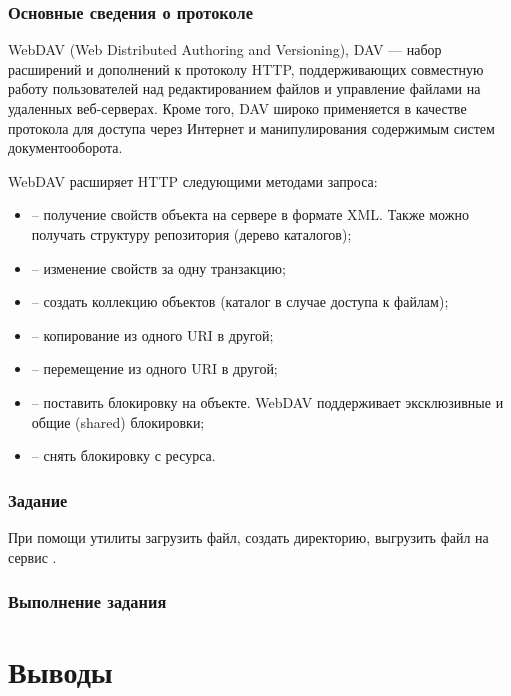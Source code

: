 \subsubsection{Основные сведения о протоколе}

WebDAV (Web Distributed Authoring and Versioning), DAV — набор расширений и дополнений к протоколу HTTP, поддерживающих совместную работу пользователей над редактированием файлов и управление файлами на удаленных веб-серверах. Кроме того, DAV широко применяется в качестве протокола для доступа через Интернет и манипулирования содержимым систем документооборота.

WebDAV расширяет HTTP следующими методами запроса:

\begin{itemize}
	\item {} -- получение свойств объекта на сервере в формате XML. Также можно получать структуру репозитория (дерево каталогов);
	\item {} -- изменение свойств за одну транзакцию;
	\item {} -- создать коллекцию объектов (каталог в случае доступа к файлам);
	\item {} -- копирование из одного URI в другой;
	\item {} -- перемещение из одного URI в другой;
	\item {} -- поставить блокировку на объекте. WebDAV поддерживает эксклюзивные и общие (shared) блокировки;
	\item {} -- снять блокировку с ресурса.
\end{itemize}

\subsubsection{Задание}

При помощи утилиты  загрузить файл, создать директорию, выгрузить файл на сервис .

\subsubsection{Выполнение задания}



\section{Выводы}

